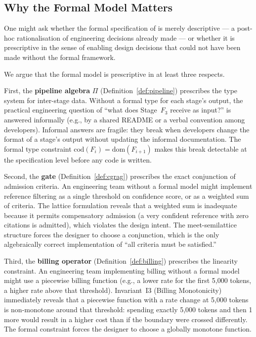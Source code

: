 \subsection{Why the Formal Model Matters}

One might ask whether the formal specification of \sys{} is merely descriptive —
a post-hoc rationalisation of engineering decisions already made — or whether it
is prescriptive in the sense of enabling design decisions that could not have been
made without the formal framework.

We argue that the formal model is prescriptive in at least three respects.

First, the \textbf{pipeline algebra} $\Pi$ (Definition~\ref{def:pipeline}) prescribes
the type system for inter-stage data.
Without a formal type for each stage's output, the practical engineering question
of ``what does Stage~$F_3$ receive as input?'' is answered informally (e.g., by a
shared README or a verbal convention among developers).
Informal answers are fragile: they break when developers change the format of a stage's
output without updating the informal documentation.
The formal type constraint $\mathrm{cod}(F_i)=\mathrm{dom}(F_{i+1})$ makes this
break detectable at the specification level before any code is written.

Second, the \textbf{\cgrag{} gate} (Definition~\ref{def:cgrag}) prescribes the exact
conjunction of admission criteria.
An engineering team without a formal model might implement reference filtering as a
single threshold on confidence score, or as a weighted sum of criteria.
The lattice formulation reveals that a weighted sum is inadequate because it permits
compensatory admission (a very confident reference with zero citations is admitted),
which violates the design intent.
The meet-semilattice structure forces the designer to choose a conjunction, which
is the only algebraically correct implementation of ``all criteria must be satisfied.''

Third, the \textbf{billing operator} (Definition~\ref{def:billing}) prescribes the
linearity constraint.
An engineering team implementing billing without a formal model might use a piecewise
billing function (e.g., a lower rate for the first 5,000 tokens, a higher rate above
that threshold).
Invariant~I3 (Billing Monotonicity) immediately reveals that a piecewise function with
a rate change at 5,000 tokens is non-monotone around that threshold: spending exactly
5,000 tokens and then 1 more would result in a higher cost than if the boundary
were crossed differently.
The formal constraint forces the designer to choose a globally monotone function.

